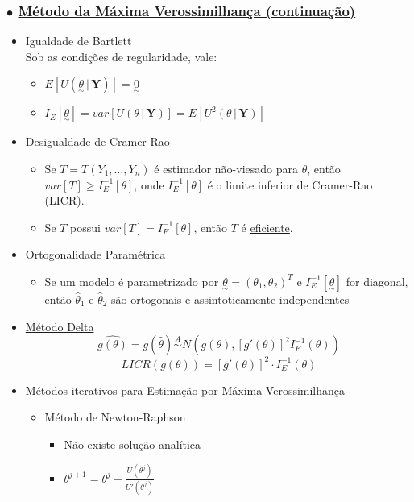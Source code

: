 \documentclass[11pt,a4paper]{article}
\newcommand{\vt}[1]{\underset{\sim}{#1}}      %
\begin{document}
\subsubsection*{$\bullet$ \underline{Método da Máxima Verossimilhança (continuação)}}
\begin{itemize}
  \item Igualdade de Bartlett \\
  Sob as condições de regularidade, vale:
  \begin{itemize}[label=$\cdot$]
    \item $E[U(\vt{\theta}\,|\,\mathbf{Y})] = \vt{0}$
    \item $I_E[\vt{\theta}] = var[U(\theta\,|\,\mathbf{Y})] = E[U^2(\theta\,|\,\mathbf{Y})]$
  \end{itemize}
  \item Desigualdade de Cramer-Rao
  \begin{itemize}[label=$\cdot$]
    \item Se $T = T(Y_1,\ldots,Y_n)$ é estimador não-viesado para $\theta$, então $var[T]\geq I_E^{-1}[\theta]$, onde $I_E^{-1}[\theta]$ é o limite inferior de Cramer-Rao (LICR).
    \item Se $T$ possui $var[T] = I_E^{-1}[\theta]$, então $T$ é \underline{eficiente}.
  \end{itemize}
  \item Ortogonalidade Paramétrica
  \begin{itemize}[label=$\cdot$]
    \item Se um modelo é parametrizado por $\vt{\theta} = (\theta_1,\theta_2)^T$ e $I_E^{-1}[\vt{\theta}]$ for diagonal, então $\hat{\theta}_1$ e $\hat{\theta}_2$ são \underline{ortogonais} e \underline{assintoticamente independentes}
  \end{itemize}
  \item \underline{Método Delta}
  \[ \widehat{g(\theta)} = g(\hat{\theta}) \overset{A}{\sim} N\!\left(g(\theta),[g'(\theta)]^2 I_E^{-1}(\theta)\right) \]
  \[ LICR(g(\theta)) = [g'(\theta)]^2\cdot I_E^{-1}(\theta) \]
  \item Métodos iterativos para Estimação por Máxima Verossimilhança
  \begin{itemize}[label=$\cdot$]
    \item Método de Newton-Raphson
    \begin{itemize}
      \item Não existe solução analítica
      \item $\displaystyle \theta^{j+1} = \theta^j - \frac{U(\theta^j)}{U'(\theta^j)}$

\end{itemize}
\end{itemize}
\end{itemize}
\end{document}
